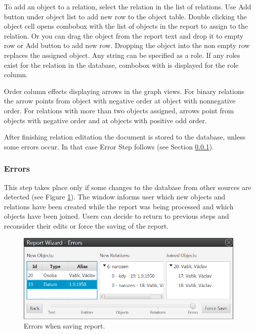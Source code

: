 To add an object to a relation, select the relation in the list of relations.
Use Add button under object list to add new row to the object table. Double
clicking the object cell opens combobox with the list of objects in the report
to assign to the relation. Or you can drag the object from the report text and
drop it to empty row or Add button to add new row. Dropping the object into the
non empty row replaces the assigned object. Any string can be specified as
a role. If any roles exist for the relation in the database, combobox with
is displayed for the role column.

Order column effects displaying arrows in the graph views. For binary
relations the arrow points from object with negative order at object with
nonnegative order. For relations with more than two objects assigned, arrows
point from objects with negative order and at objects with positive odd order.

After finishing relation editation the document is stored to the database,
unless some errors occur. In that case Error Step follows (see Section
\ref{sssec:Errors}).

\subsubsection{Errors}
\label{sssec:Errors}

This step takes place only if some changes to the database from other sources
are detected (see Figure \ref{fig:Errors}). The window informs user which new
objects and relations have been created while the report was being processed and
which objects have been joined. Users can decide to return to previous steps
and reconsider their edits or force the saving of the report.

\begin{figure}[!htb]
        \centering
        \includegraphics[width=\textwidth]{Images/errors}
        \caption{Errors when saving report.}
        \label{fig:Errors}
\end{figure}

